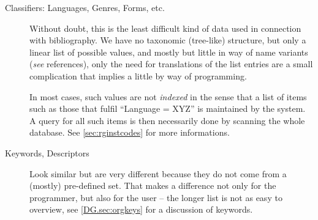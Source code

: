 \begin{description}
\item[Classifiers: Languages, Genres, Forms, etc.] Without doubt, this
  is the least difficult kind of data used in connection with
  bibliography.  We have no taxonomic (tree-like) structure, but only a
  linear list of possible values, and mostly but little in way of name
  variants (\textit{see} references), only the need for translations of
  the list entries are a small complication that implies a little by
  way of programming.
  
  In most cases, such values are not \textit{indexed} in the sense
  that a list of items such as those that fulfil ``Language = XYZ'' is
  maintained by the system.  A query for all such items is then 
  necessarily done by scanning the whole database.  See
  \ref{sec:rginstcodes} for more informations.
\item[Keywords, Descriptors] Look similar but are very different
  because they do not come from a (mostly) pre-defined set.  That
  makes a difference not only for the programmer, but also for the
  user -- the longer list is not as easy to overview, see
  \ref{DG.sec:orgkeys} for a discussion of keywords.
  

\end{description}
